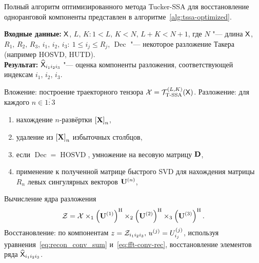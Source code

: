 \documentclass[specialist,
  substylefile = spbu.rtx,
subf,href,colorlinks=true, 12pt]{disser}
\theoremstyle{plain}
\theoremstyle{definition}
\theoremstyle{remark}
\newcommand{\Input}{\textbf{Входные данные: }}
\newcommand{\Output}{\textbf{Результат: }}
\def\newdecomp/{HUTD}
\def\tssa/{Tucker-SSA}
\begin{document}
Полный алгоритм оптимизированного метода \tssa/ для восстановление
одноранговой компоненты представлен в алгоритме~\ref{alg:tssa-optimized}.
\begin{algorithm}[!ht]
  \caption{Оптимизированный алгоритм \tssa/}
  \label{alg:tssa-optimized}
  \Input $\mathsf{X}$, $L,\,K: 1< L,\,K < N,\, L + K < N + 1$, где $N$ "---
  длина $\mathsf{X}$, $R_1,\, R_2,\, R_3$, $i_1,\, i_2,\, i_3:\: 1 \leqslant
  i_j \leqslant R_j$, $\operatorname{Dec}$ "--- некоторое разложение
  Такера (например HOSVD, \newdecomp/).\\
  \Output $\widehat{\mathsf{X}}_{i_1i_2i_3}$ "--- оценка компоненты
  разложения, соответствующей индексам $i_1$, $i_2$, $i_3$.
  \begin{algorithmic}[1]
    \State \label{algstep:tssa-opt-inj}
    Вложение: построение траекторного тензора $\mathcal{X}
    =\mathcal{T}_{\textrm{T-SSA}}^{(L, K)} (\mathsf{X})$.
    \State \label{algstep:tssa-opt-decomp}
    Разложение: для каждого $n \in \overline{1:3}$
    \begin{enumerate}
      \item нахождение $n$-развёртки $\left[\mathbf{X}\right]_n$,
      \item удаление из $\left[\mathbf{X}\right]_n$ избыточных столбцов,
      \item если $\operatorname{Dec} = \operatorname{HOSVD}$, умножение на
        весовую матрицу $\mathbf{D}$,
      \item применение к полученной матрице быстрого SVD для
        нахождения матрицы $R_n$ левых сингулярных векторов $\mathbf{U}^{(n)}$,
    \end{enumerate}
    \State \label{algstep:tssa-opt-core}  Вычисление ядра разложения \[
      \mathcal{Z} = \mathcal{X} \times_1
      \left(\mathbf{U}^{(1)}\right)^{\mathrm{H}} \times_2
      \left(\mathbf{U}^{(2)}\right)^{\mathrm{H}}\times_3 \left(\mathbf{U}^{(3)}\right)^{\mathrm{H}}.
    \]
    \State Восстановление: по компонентам $z = \mathcal{Z}_{i_1i_2i_3},\,
    u^{(j)} = U^{(j)}_{i_j}$, используя
    уравнения~\eqref{eq:recon_conv_sum} и~\eqref{eq:fft-conv-rec},
    восстановление элементов ряда $\widehat{\mathsf{X}}_{i_1i_2i_3}$.
  \end{algorithmic}
\end{algorithm}
\end{document}
